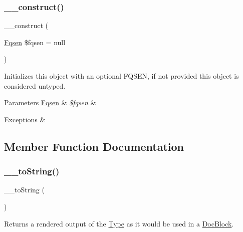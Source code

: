 \subsubsection{\texorpdfstring{\+\_\+\+\_\+construct()}{\_\_construct()}}
{\footnotesize\ttfamily \+\_\+\+\_\+construct (\begin{DoxyParamCaption}\item[{\mbox{\hyperlink{classphp_documentor_1_1_reflection_1_1_fqsen}{Fqsen}}}]{\$fqsen = {\ttfamily null} }\end{DoxyParamCaption})}

Initializes this object with an optional F\+Q\+S\+EN, if not provided this object is considered \textquotesingle{}untyped\textquotesingle{}.


\begin{DoxyParams}[1]{Parameters}
\mbox{\hyperlink{classphp_documentor_1_1_reflection_1_1_fqsen}{Fqsen}} & {\em \$fqsen} & \\
\hline
\end{DoxyParams}

\begin{DoxyExceptions}{Exceptions}
{\em } & \\
\hline
\end{DoxyExceptions}


\subsection{Member Function Documentation}
\mbox{\label{classphp_documentor_1_1_reflection_1_1_types_1_1_object___a7516ca30af0db3cdbf9a7739b48ce91d}} 
\subsubsection{\texorpdfstring{\+\_\+\+\_\+to\+String()}{\_\_toString()}}
{\footnotesize\ttfamily \+\_\+\+\_\+to\+String (\begin{DoxyParamCaption}{ }\end{DoxyParamCaption})}

Returns a rendered output of the \mbox{\hyperlink{interfacephp_documentor_1_1_reflection_1_1_type}{Type}} as it would be used in a \mbox{\hyperlink{classphp_documentor_1_1_reflection_1_1_doc_block}{Doc\+Block}}.

